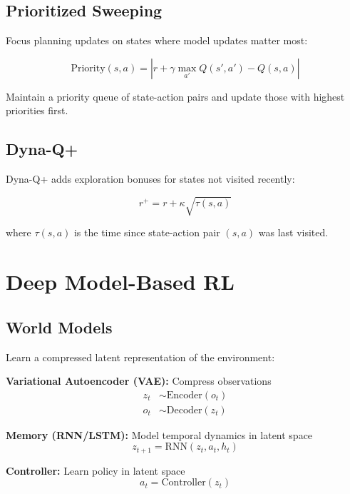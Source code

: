 \subsection{Prioritized Sweeping}

Focus planning updates on states where model updates matter most:

\begin{equation}
\text{Priority}(s,a) = |r + \gamma \max_{a'} Q(s',a') - Q(s,a)|
\end{equation}

Maintain a priority queue of state-action pairs and update those with highest priorities first.

\subsection{Dyna-Q+}

Dyna-Q+ adds exploration bonuses for states not visited recently:

\begin{equation}
r^+ = r + \kappa \sqrt{\tau(s,a)}
\end{equation}

where $\tau(s,a)$ is the time since state-action pair $(s,a)$ was last visited.

\section{Deep Model-Based RL}

\subsection{World Models}

Learn a compressed latent representation of the environment:

\textbf{Variational Autoencoder (VAE):} Compress observations
\begin{align}
z_t &\sim \text{Encoder}(o_t) \\
\hat{o}_t &\sim \text{Decoder}(z_t)
\end{align}

\textbf{Memory (RNN/LSTM):} Model temporal dynamics in latent space
\begin{equation}
z_{t+1} = \text{RNN}(z_t, a_t, h_t)
\end{equation}

\textbf{Controller:} Learn policy in latent space
\begin{equation}
a_t = \text{Controller}(z_t)
\end{equation}

